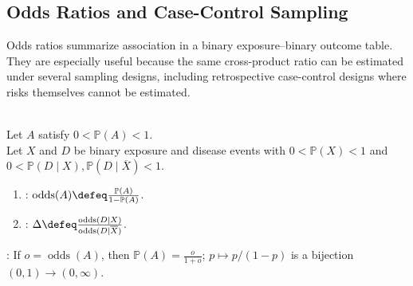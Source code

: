 \subsection{Odds Ratios and Case-Control Sampling}

Odds ratios summarize association in a binary exposure--binary outcome table.  They are especially useful because the same cross-product ratio can be estimated under several sampling designs, including retrospective case-control designs where risks themselves cannot be estimated.

\begin{definition} \label{def:odds-and-odds-ratio} \\
Let $A$ satisfy $0<\mathbb{P}(A)<1$.\\
Let $X$ and $D$ be binary exposure and disease events with $0<\mathbb{P}(X)<1$ and $0<\mathbb{P}(D\mid X),\mathbb{P}(D\mid\overline{X})<1$.
\begin{enumerate}[label=(\roman*)]
\setlength{\itemsep}{0pt}
\item {}: $\operatorname{odds}(A)\defeq\frac{\mathbb{P}(A)}{1-\mathbb{P}(A)}$.
\item {}: $\Delta\defeq\frac{\operatorname{odds}(D\mid X)}{\operatorname{odds}(D\mid\overline{X})}$.
\end{enumerate}
: If $o=\operatorname{odds}(A)$, then $\mathbb{P}(A)=\frac{o}{1+o}$; $p\mapsto p/(1-p)$ is a bijection $(0,1)\to(0,\infty)$.
\end{definition}

